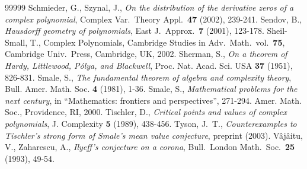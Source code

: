\documentclass[10pt,twoside,a4paper,reqno]{amsart}
\theoremstyle{plain}
\theoremstyle{definition}
\begin{document}
\begin{thebibliography}{99999}
Schmieder, G., Szynal, J., {\em On the distribution of the derivative zeros 
of a complex polynomial}, Complex Var.~Theory Appl.~{\bf 47} (2002), 239-241.
Sendov, B., {\em Hausdorff geometry of polynomials}, East J.~Approx.~{\bf 7} 
(2001), 123-178.
Sheil-Small, T., Complex Polynomials, Cambridge Studies 
in Adv.~Math.~vol.~{\bf 75}, Cambridge Univ.~Press, Cambridge, UK, 2002.
Sherman, S., {\em On a theorem of Hardy, Littlewood, P\'olya, and Blackwell}, 
Proc. Nat. Acad. Sci. USA {\bf 37} (1951), 826-831.
Smale, S., {\em The fundamental theorem of algebra and complexity theory}, 
Bull. Amer. Math. Soc. {\bf 4} (1981), 1-36.
Smale, S., {\em Mathematical problems for the next century}, in ``Mathematics: 
frontiers and perspectives'', 271-294. Amer. Math. Soc., Providence, RI, 2000.
Tischler, D., {\em Critical points and values of complex polynomials}, 
J. Complexity {\bf 5} (1989), 438-456.
Tyson, J.~T., {\em Counterexamples to Tischler's strong form of Smale's 
mean value conjecture}, preprint (2003).
V\^aj\^aitu, V., Zaharescu, A., {\em Ilyeff's conjecture on a corona}, 
Bull.~London Math.~Soc.~{\bf 25} (1993), 49-54.

\end{thebibliography}
\end{document}
